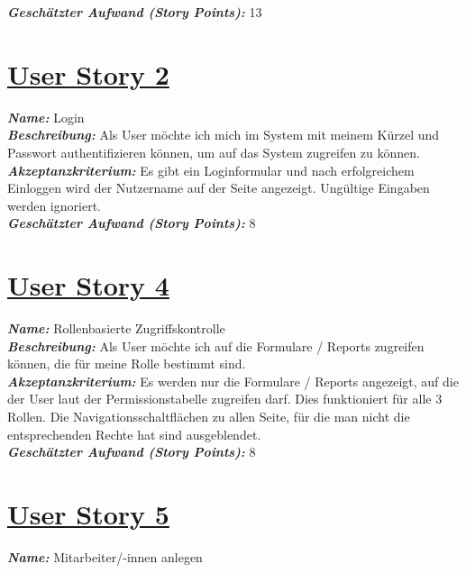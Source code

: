 \documentclass[12pt]{article}%
\begin{document}
\textbf{\textit{Geschätzter Aufwand (Story Points):}} 13
\\


\section*{\large \underline{User Story 2}}
\textit{\textbf{Name:}} Login
\\

\textbf{\textit{Beschreibung:}} Als User möchte ich mich im System mit meinem Kürzel und Passwort authentifizieren können, um auf das System zugreifen zu können.
\\

\textbf{\textit{Akzeptanzkriterium:}} Es gibt ein Loginformular und nach erfolgreichem Einloggen wird der Nutzername auf der Seite angezeigt. Ungültige Eingaben werden ignoriert.
\\

\textbf{\textit{Geschätzter Aufwand (Story Points):}} 8
\\


\section*{\large \underline{User Story 4}}
\textit{\textbf{Name:}} Rollenbasierte Zugriffskontrolle
\\

\textbf{\textit{Beschreibung:}} Als User möchte ich auf die Formulare / Reports zugreifen können, die für meine Rolle bestimmt sind.
\\

\textbf{\textit{Akzeptanzkriterium:}} Es werden nur die Formulare / Reports angezeigt, auf die der User laut der Permissionstabelle zugreifen darf. Dies funktioniert für alle 3 Rollen. Die Navigationsschaltflächen zu allen Seite, für die man nicht die entsprechenden Rechte hat sind ausgeblendet.
\\

\textbf{\textit{Geschätzter Aufwand (Story Points):}} 8
\\


\section*{\large \underline{User Story 5}}
\textit{\textbf{Name:}} Mitarbeiter/-innen anlegen
\\
\end{document}
